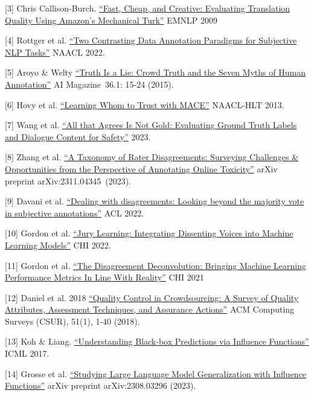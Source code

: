 {[}3{]} Chris Callison-Burch. \href{https://aclanthology.org/D09-1030/}{``Fast, Cheap, and Creative: Evaluating Translation Quality Using Amazon's Mechanical Turk''} EMNLP 2009

{[}4{]} Rottger et al. \href{https://arxiv.org/abs/2112.07475}{``Two Contrasting Data Annotation Paradigms for Subjective NLP Tasks''} NAACL 2022.

{[}5{]} Aroyo \& Welty \href{https://ojs.aaai.org/aimagazine/index.php/aimagazine/article/view/2564}{``Truth Is a Lie: Crowd Truth and the Seven Myths of Human Annotation''} AI Magazine~36.1: 15-24 (2015).

{[}6{]} Hovy et al. \href{https://aclanthology.org/N13-1132.pdf}{``Learning Whom to Trust with MACE''} NAACL-HLT 2013.

{[}7{]} Wang et al. \href{https://research.google/pubs/all-that-agrees-is-not-gold-evaluating-ground-truth-labels-and-dialogue-content-for-safety/}{``All that Agrees Is Not Gold: Evaluating Ground Truth Labels and Dialogue Content for Safety''} 2023.

{[}8{]} Zhang et al. \href{https://arxiv.org/abs/2311.04345}{``A Taxonomy of Rater Disagreements: Surveying Challenges \& Opportunities from the Perspective of Annotating Online Toxicity''} arXiv preprint arXiv:2311.04345~(2023).

{[}9{]} Davani et al. \href{https://arxiv.org/abs/2110.05719}{``Dealing with disagreements: Looking beyond the majority vote in subjective annotations''} ACL 2022.

{[}10{]} Gordon et al. \href{https://arxiv.org/abs/2202.02950}{``Jury Learning: Integrating Dissenting Voices into Machine Learning Models''} CHI 2022.

{[}11{]} Gordon et al. \href{https://dl.acm.org/doi/abs/10.1145/3411764.3445423}{``The Disagreement Deconvolution: Bringing Machine Learning Performance Metrics In Line With Reality''} CHI 2021

{[}12{]} Daniel et al. 2018 \href{https://arxiv.org/abs/1801.02546}{``Quality Control in Crowdsourcing: A Survey of Quality Attributes, Assessment Techniques, and Assurance Actions''} ACM Computing Surveys (CSUR), 51(1), 1-40 (2018).

{[}13{]} Koh \& Liang. \href{https://arxiv.org/abs/1703.04730}{``Understanding Black-box Predictions via Influence Functions''} ICML 2017.

{[}14{]} Grosse et al. \href{https://arxiv.org/abs/2308.03296}{``Studying Large Language Model Generalization with Influence Functions''} arXiv preprint arXiv:2308.03296 (2023).

